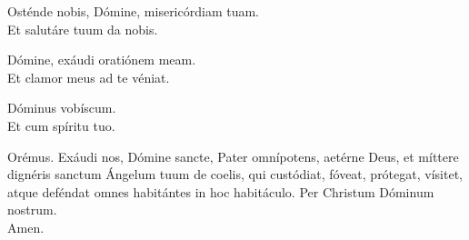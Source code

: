 \begin{minipage}{0.7\linewidth}
	\setlength{\parskip}{0.5em}
	Osténde nobis, Dómine, misericórdiam tuam.\\
	\R Et salutáre tuum da nobis.

	Dómine, exáudi oratiónem meam.\\
	\R Et clamor meus ad te véniat.

	Dóminus vobíscum.\\
	\R Et cum spíritu tuo.

	Orémus. Exáudi nos, Dómine sancte, Pater omnípotens, aetérne Deus,
	et míttere dignéris sanctum Ángelum tuum de coelis, qui custódiat,
	fóveat, prótegat, vísitet, atque deféndat omnes habitántes in hoc habitáculo.
	Per Christum Dóminum nostrum.\\
	\R Amen.
\end{minipage}
%
\begin{minipage}{0.05\linewidth}~\end{minipage}
%
\begin{minipage}{0.25\linewidth}
	\setlength{\parskip}{0.5em}

	\footnotesize{}
\end{minipage}
